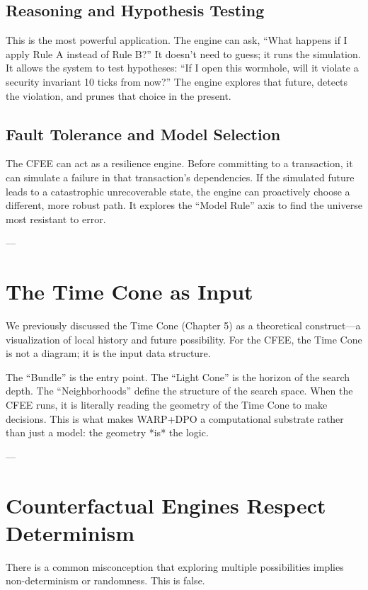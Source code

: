 \subsection{Reasoning and Hypothesis Testing}
This is the most powerful application. The engine can ask, ``What happens if I apply Rule A instead of Rule B?'' It doesn't need to guess; it runs the simulation. It allows the system to test hypotheses: ``If I open this wormhole, will it violate a security invariant 10 ticks from now?'' The engine explores that future, detects the violation, and prunes that choice in the present.

\subsection{Fault Tolerance and Model Selection}
The CFEE can act as a resilience engine. Before committing to a transaction, it can simulate a failure in that transaction's dependencies. If the simulated future leads to a catastrophic unrecoverable state, the engine can proactively choose a different, more robust path. It explores the ``Model Rule'' axis to find the universe most resistant to error.

---

\section{The Time Cone as Input}

We previously discussed the Time Cone (Chapter 5) as a theoretical construct—a visualization of local history and future possibility. For the CFEE, the Time Cone is not a diagram; it is the input data structure.

The ``Bundle'' is the entry point. The ``Light Cone'' is the horizon of the search depth. The ``Neighborhoods'' define the structure of the search space. When the CFEE runs, it is literally reading the geometry of the Time Cone to make decisions. This is what makes WARP+DPO a computational substrate rather than just a model: the geometry *is* the logic.

---

\section{Counterfactual Engines Respect Determinism}

There is a common misconception that exploring multiple possibilities implies non-determinism or randomness. This is false.

